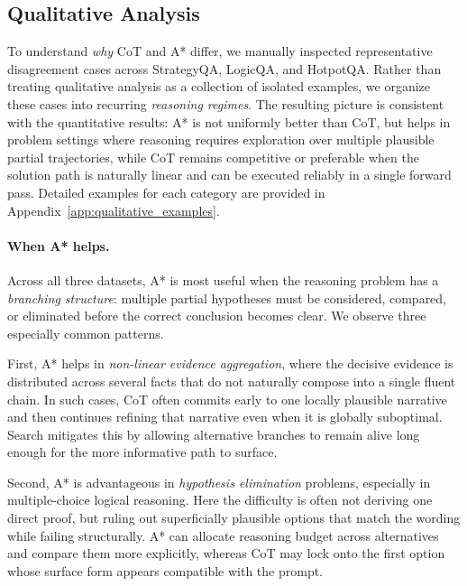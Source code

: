 \documentclass[11pt]{article}
\begin{document}
\subsection{Qualitative Analysis}
\label{sec:qualitative_conclusions}

To understand \emph{why} CoT and A* differ, we manually inspected representative disagreement cases across StrategyQA, LogicQA, and HotpotQA. Rather than treating qualitative analysis as a collection of isolated examples, we organize these cases into recurring \emph{reasoning regimes}. The resulting picture is consistent with the quantitative results: A* is not uniformly better than CoT, but helps in problem settings where reasoning requires exploration over multiple plausible partial trajectories, while CoT remains competitive or preferable when the solution path is naturally linear and can be executed reliably in a single forward pass. Detailed examples for each category are provided in Appendix~\ref{app:qualitative_examples}.

\paragraph{When A* helps.}
Across all three datasets, A* is most useful when the reasoning problem has a \emph{branching structure}: multiple partial hypotheses must be considered, compared, or eliminated before the correct conclusion becomes clear. We observe three especially common patterns.

First, A* helps in \emph{non-linear evidence aggregation}, where the decisive evidence is distributed across several facts that do not naturally compose into a single fluent chain. In such cases, CoT often commits early to one locally plausible narrative and then continues refining that narrative even when it is globally suboptimal. Search mitigates this by allowing alternative branches to remain alive long enough for the more informative path to surface.

Second, A* is advantageous in \emph{hypothesis elimination} problems, especially in multiple-choice logical reasoning. Here the difficulty is often not deriving one direct proof, but ruling out superficially plausible options that match the wording while failing structurally. A* can allocate reasoning budget across alternatives and compare them more explicitly, whereas CoT may lock onto the first option whose surface form appears compatible with the prompt.
\end{document}
